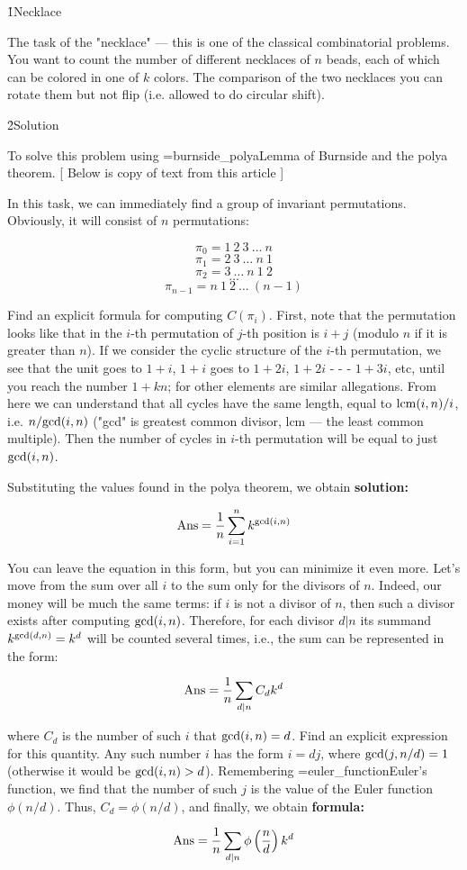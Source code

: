 \h1{Necklace}

The task of the "necklace" --- this is one of the classical combinatorial problems. You want to count the number of different necklaces of $n$ beads, each of which can be colored in one of $k$ colors. The comparison of the two necklaces you can rotate them but not flip (i.e. allowed to do circular shift).

\h2{Solution}

To solve this problem using \algohref=burnside_polya{Lemma of Burnside and the polya theorem}. [ Below is copy of text from this article ]

In this task, we can immediately find a group of invariant permutations. Obviously, it will consist of $n$ permutations:

$$ \pi_0 = 1\ 2\ 3\ \ldots\ n $$
$$ \pi_1 = 2\ 3\ \ldots\ n\ 1 $$
$$ \pi_2 = 3\ \ldots\ n\ 1\ 2 $$
$$ \ldots $$
$$ \pi_{n-1} = n\ 1\ 2\ \ldots\ (n-1) $$

Find an explicit formula for computing $C(\pi_i)$. First, note that the permutation looks like that in the $i$-th permutation of $j$-th position is $i+j$ (modulo $n$ if it is greater than $n$). If we consider the cyclic structure of the $i$-th permutation, we see that the unit goes to $1+i$, $1+i$ goes to $1+2i$, $1+2i$ - - - $1+3i$, etc, until you reach the number $1 + kn$; for other elements are similar allegations. From here we can understand that all cycles have the same length, equal to ${\rm lcm}(i,n) / i$, i.e. $n / {\rm gcd}(i,n)$ ("gcd" is greatest common divisor, lcm --- the least common multiple). Then the number of cycles in $i$-th permutation will be equal to just ${\rm gcd}(i,n)$.

Substituting the values found in the polya theorem, we obtain \bf{solution}:

$$ {\rm Ans} = \frac{1}{n} \sum_{i=1}^{n} k ^ {{\rm gcd}(i,n)} $$

You can leave the equation in this form, but you can minimize it even more. Let's move from the sum over all $i$ to the sum only for the divisors of $n$. Indeed, our money will be much the same terms: if $i$ is not a divisor of $n$, then such a divisor exists after computing ${\rm gcd}(i,n)$. Therefore, for each divisor $d|n$ its summand $k^{{\rm gcd}(d,n)} = k^d$ will be counted several times, i.e., the sum can be represented in the form:

$$ {\rm Ans} = \frac{1}{n} \sum_{d|n} C_d k^d $$

where $C_d$ is the number of such $i$ that ${\rm gcd}(i,n) = d$. Find an explicit expression for this quantity. Any such number $i$ has the form $i=dj$, where ${\rm gcd}(j,n/d) = 1$ (otherwise it would be ${\rm gcd}(i,n) > d$). Remembering \algohref=euler_function{Euler's function}, we find that the number of such $j$ is the value of the Euler function $\phi(n/d)$. Thus, $C_d = \phi(n/d)$, and finally, we obtain \bf{formula}:

$$ {\rm Ans} = \frac{1}{n} \sum_{d|n} \phi \left( \frac{n}{d} \right) k^d $$
